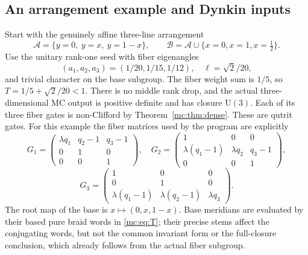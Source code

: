 \documentclass[11pt,a4paper]{article}
\theoremstyle{remark}\newtheorem{remark}[theorem]{Remark}
\newcommand{\U}{\mathrm U}
\newcommand{\A}{\mathcal A}
\newcommand{\B}{\mathcal B}
\begin{document}
\subsection{An arrangement example and Dynkin inputs}
Start with the genuinely affine three-line arrangement
\[
 \A=\{y=0,\ y=x,\ y=1-x\},\qquad
 \B=\A\cup\{x=0,x=1,x=\tfrac12\}.
\]
Use the unitary rank-one seed with fiber eigenangles
\[
 (a_1,a_2,a_3)=(1/20,1/15,1/12),\quad
 \ell=\sqrt2/20,
\]
and trivial character on the base subgroup. The fiber weight sum is
$1/5$, so $T=1/5+\sqrt2/20<1$. There is no middle rank drop, and
the actual three-dimensional MC output is positive definite and has
closure $\U(3)$. Each of its three fiber gates is non-Clifford by
Theorem~\ref{mc:thm:dense}. These are qutrit gates.
For this example the fiber matrices used by the program are explicitly
\[
 G_1=\begin{pmatrix}\lambda q_1&q_2-1&q_3-1\\0&1&0\\0&0&1\end{pmatrix},\quad
 G_2=\begin{pmatrix}1&0&0\\\lambda(q_1-1)&\lambda q_2&q_3-1\\0&0&1\end{pmatrix},
\]
\[
 G_3=\begin{pmatrix}1&0&0\\0&1&0\\\lambda(q_1-1)&\lambda(q_2-1)&\lambda q_3\end{pmatrix}.
\]
The root map of the base is $x\mapsto(0,x,1-x)$. Base meridians
are evaluated by their based pure braid words in \eqref{mc:eq:T}; their
precise stems affect the conjugating words, but not the common
invariant form or the full-closure conclusion, which already follows
from the actual fiber subgroup.
\end{document}
